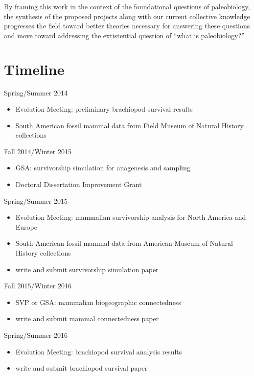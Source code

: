 \documentclass[12pt,letterpaper]{article}
\begin{document}
By framing this work in the context of the foundational questions of paleobiology, the synthesis of the proposed projects along with our current collective knowledge progresses the field toward better theories necessary for answering these questions and move toward addressing the extistential question of ``what is paleobiology?''


\clearpage
\section{Timeline}

Spring/Summer 2014
\begin{itemize}
  \item Evolution Meeting: preliminary brachiopod survival results
  \item South American fossil mammal data from Field Museum of Natural History collections
\end{itemize}

Fall 2014/Winter 2015
\begin{itemize}
  \item GSA: survivorship simulation for anagenesis and sampling
  \item Doctoral Dissertation Improvement Grant
\end{itemize}

Spring/Summer 2015
\begin{itemize}
  \item Evolution Meeting: mammalian survivorship analysis for North America and Europe
  \item South American fossil mammal data from American Museum of Natural History collections
  \item write and submit survivorship simulation paper
\end{itemize}

Fall 2015/Winter 2016
\begin{itemize}
  \item SVP or GSA: mammalian biogeographic connectedness
  \item write and submit mammal connectedness paper
\end{itemize}

Spring/Summer 2016
\begin{itemize}
  \item Evolution Meeting: brachiopod survival analysis results
  \item write and submit brachiopod survival paper
\end{itemize}
\end{document}
